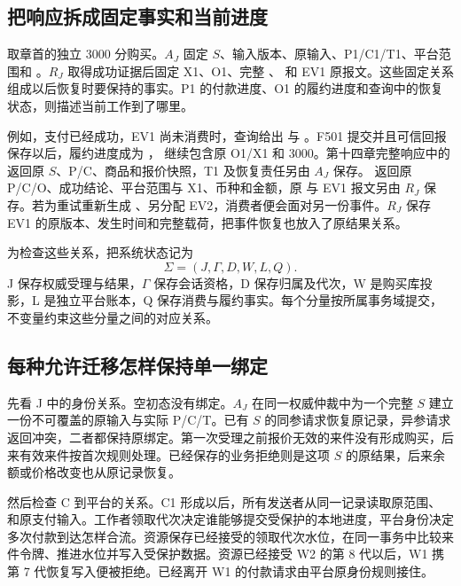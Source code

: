 \subsection*{把响应拆成固定事实和当前进度}

取章首的独立 3000 分购买。$A_J$ 固定 $S$、输入版本、原输入、P1/C1/T1、平台范围和 。$R_J$ 取得成功证据后固定 X1、O1、完整 、 和 EV1 原报文。这些固定关系组成以后恢复时要保持的事实。P1 的付款进度、O1 的履约进度和查询中的恢复状态，则描述当前工作到了哪里。

例如，支付已经成功，EV1 尚未消费时，查询给出  与 。F501 提交并且可信回报保存以后，履约进度成为 ， 继续包含原 O1/X1 和 3000。第十四章完整响应中的  返回原 $S$、P/C、商品和报价快照，T1 及恢复责任另由 $A_J$ 保存。 返回原 P/C/O、成功结论、平台范围与 X1、币种和金额，原  与 EV1 报文另由 $R_J$ 保存。若为重试重新生成 、另分配 EV2，消费者便会面对另一份事件。$R_J$ 保存 EV1 的原版本、发生时间和完整载荷，把事件恢复也放入了原结果关系。


为检查这些关系，把系统状态记为
\[
\Sigma=(J,\Gamma,D,W,L,Q).
\]
J 保存权威受理与结果，$\Gamma$ 保存会话资格，D 保存归属及代次，W 是购买库投影，L 是独立平台账本，Q 保存消费与履约事实。每个分量按所属事务域提交，不变量约束这些分量之间的对应关系。

\subsection*{每种允许迁移怎样保持单一绑定}

先看 J 中的身份关系。空初态没有绑定。$A_J$ 在同一权威仲裁中为一个完整 $S$ 建立一份不可覆盖的原输入与实际 P/C/T。已有 $S$ 的同参请求恢复原记录，异参请求返回冲突，二者都保持原绑定。第一次受理之前报价无效的来件没有形成购买，后来有效来件按首次规则处理。已经保存的业务拒绝则是这项 $S$ 的原结果，后来余额或价格改变也从原记录恢复。

然后检查 C 到平台的关系。C1 形成以后，所有发送者从同一记录读取原范围、 和原支付输入。工作者领取代次决定谁能够提交受保护的本地进度，平台身份决定多次付款到达怎样合流。资源保存已经接受的领取代次水位，在同一事务中比较来件令牌、推进水位并写入受保护数据。资源已经接受 W2 的第 8 代以后，W1 携第 7 代恢复写入便被拒绝。已经离开 W1 的付款请求由平台原身份规则接住。

